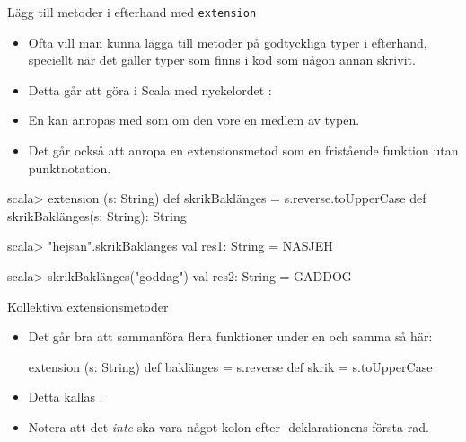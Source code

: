 \begin{Slide}{Lägg till metoder i efterhand med \texttt{extension}}\SlideFontSmall
\begin{itemize}\SlideFontSmall
\item Ofta vill man kunna lägga till metoder på godtyckliga typer i efterhand, speciellt när det gäller typer som finns i kod som någon annan skrivit.
\item Detta går att göra i Scala med nyckelordet :\\{\SlideFontTiny{}}
\item En  kan anropas med  som om den vore en medlem av typen.
\item Det går också att anropa en extensionsmetod som en fristående funktion utan punktnotation.
\end{itemize}  
\begin{REPL}
scala> extension (s: String) def skrikBaklänges = s.reverse.toUpperCase
def skrikBaklänges(s: String): String

scala> "hejsan".skrikBaklänges
val res1: String = NASJEH

scala> skrikBaklänges("goddag")
val res2: String = GADDOG
\end{REPL}
\end{Slide}

\begin{Slide}{Kollektiva extensionsmetoder}
\begin{itemize}
  \item 
Det går bra att sammanföra flera funktioner under en och samma  så här:
\begin{Code}
extension (s: String)
  def baklänges = s.reverse
  def skrik = s.toUpperCase
\end{Code}
\item Detta kallas  . 
\item Notera att det \emph{inte} ska vara något kolon efter -deklarationens första rad.
  
\end{itemize}
\end{Slide}


